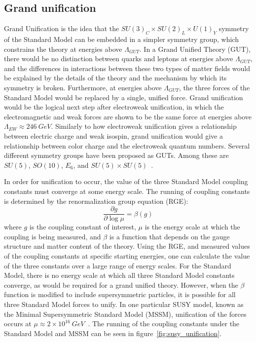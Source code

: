 \subsection{Grand unification}\label{subsec:susy_unification}

Grand Unification is the idea that the $SU(3)_C \times SU(2)_L \times U(1)_Y$ symmetry of the Standard Model can be embedded in a simpler symmetry group, which constrains the theory at energies above $\Lambda_{GUT}$.
In a Grand Unified Theory (GUT), there would be no distinction between quarks and leptons at energies above $\Lambda_{GUT}$, and the differences in interactions between these two types of matter fields would be explained by the details of the theory and the mechanism by which its symmetry is broken.
Furthermore, at energies above $\Lambda_{GUT}$, the three forces of the Standard Model would be replaced by a single, unified force.
Grand unification would be the logical next step after electroweak unification, in which the electromagnetic and weak forces are shown to be the same force at energies above $\Lambda_{EW}\approx 246~GeV$.
Similarly to how electroweak unification gives a relationship between electric charge and weak isospin, grand unification would give a relationship between color charge and the electroweak quantum numbers.
Several different symmetry groups have been proposed as GUTs.
Among these are $SU(5)$, $SO(10)$, $E_6$, and $SU(5)\times SU(5)$~\cite{susy-unification-1998}.

In order for unification to occur, the value of the three Standard Model coupling constants must converge at some energy scale.
The running of coupling constants is determined by the renormalization group equation (RGE):
\begin{equation}\label{eq:renorm_group}
    \frac{\partial g}{\partial \log \mu} = \beta(g)
\end{equation}
where $g$ is the coupling constant of interest, $\mu$ is the energy scale at which the coupling is being measured, and $\beta$ is a function that depends on the gauge structure and matter content of the theory.
Using the RGE, and measured values of the coupling constants at specific starting energies,
one can calculate the value of the three constants over a large range of energy scales.
For the Standard Model, there is no energy scale at which all three Standard Model constants converge, as would be required for a grand unified theory.
However, when the $\beta$ function is modified to include supersymmetric particles, it is possible for all three Standard Model forces to unify.
In one particular SUSY model, known as the Minimal Supersymmetric Standard Model (MSSM), unification of the forces occurs at $\mu \approx 2\times10^{16}~GeV$~\cite{susy-unification-1998}.
The running of the coupling constants under the Standard Model and MSSM can be seen in figure~\ref{fig:susy_unification}.

